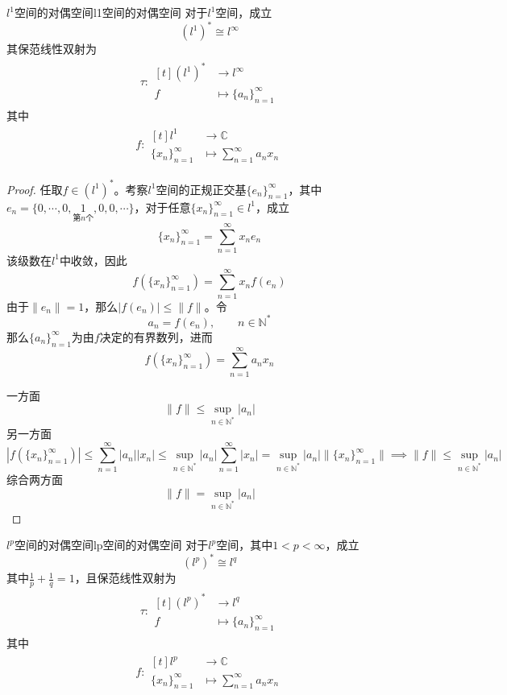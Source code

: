 \documentclass[lang = cn, scheme = chinese, thmcnt = section]{elegantbook}
\newcommand{\N}{\mathbb{N}}            %
\newcommand{\C}{\mathbb{C}}  		   %
\begin{document}
\begin{theorem}{$l^1$空间的对偶空间}{l1空间的对偶空间}
	对于$l^1$空间，成立
	$$
	(l^1)^*\cong l^\infty
	$$
	其保范线性双射为
	\begin{align*}
		\tau:\begin{aligned}[t]
			(l^1)^*&\longrightarrow l^\infty\\
			f&\longmapsto \{a_n\}_{n=1}^{\infty}
		\end{aligned}
	\end{align*}
	其中
	\begin{align*}
		f:\begin{aligned}[t]
			l^1&\longrightarrow \C\\
			\{x_n\}_{n=1}^{\infty}&\longmapsto \sum_{n=1}^{\infty}a_nx_n
		\end{aligned}
	\end{align*}
\end{theorem}

\begin{proof}
	任取$f\in (l^1)^*$。考察$l^1$空间的正规正交基$\{e_n\}_{n=1}^{\infty}$，其中$e_n=\{0,\cdots,0,\underset{\text{第}n\text{个}}{1},0,0,\cdots\}$，对于任意$\{x_n\}_{n=1}^{\infty}\in l^1$，成立
	$$
	\{x_n\}_{n=1}^{\infty}=\sum_{n=1}^{\infty}x_ne_n
	$$
	该级数在$l^1$中收敛，因此
	$$
	f(\{x_n\}_{n=1}^{\infty})=\sum_{n=1}^{\infty}x_nf(e_n)
	$$
	由于$\|e_n\|=1$，那么$|f(e_n)|\le \|f\|$。令
	$$
	a_n=f(e_n),\qquad n\in\N^*
	$$
	那么$\{a_n\}_{n=1}^{\infty}$为由$f$决定的有界数列，进而
	$$
	f(\{x_n\}_{n=1}^{\infty})=\sum_{n=1}^{\infty}a_nx_n
	$$
	
	一方面
	$$
	\|f\|\le\sup_{n\in\N^*}|a_n|
	$$
	另一方面
	$$
	|f(\{x_n\}_{n=1}^{\infty})|
	\le \sum_{n=1}^{\infty}|a_n||x_n|
	\le \sup_{n\in\N^*}|a_n|\sum_{n=1}^{\infty}|x_n|
	= \sup_{n\in\N^*}|a_n|\| \{x_n\}_{n=1}^{\infty} \|
	\implies 
	\|f\|\le \sup_{n\in\N^*}|a_n|
	$$
	综合两方面
	$$
	\|f\|=\sup_{n\in\N^*}|a_n|
	$$
\end{proof}

\begin{theorem}{$l^p$空间的对偶空间}{lp空间的对偶空间}
	对于$l^p$空间，其中$1<p<\infty$，成立
	$$
	(l^p)^*\cong l^q
	$$
	其中$\frac{1}{p}+\frac{1}{q}=1$，且保范线性双射为
	\begin{align*}
		\tau:\begin{aligned}[t]
			(l^p)^*&\longrightarrow l^q\\
			f&\longmapsto \{a_n\}_{n=1}^{\infty}
		\end{aligned}
	\end{align*}
	其中
	\begin{align*}
		f:\begin{aligned}[t]
			l^p&\longrightarrow \C\\
			\{x_n\}_{n=1}^{\infty}&\longmapsto \sum_{n=1}^{\infty}a_nx_n
		\end{aligned}
	\end{align*}
\end{theorem}
\end{document}
